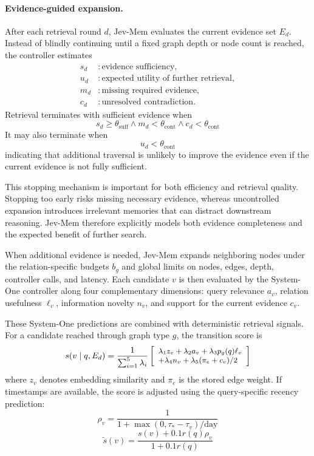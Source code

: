 \documentclass[11pt]{article}
\begin{document}
\paragraph{Evidence-guided expansion.}
After each retrieval round $d$, Jev-Mem evaluates the current evidence set $E_d$. Instead of blindly continuing until a fixed graph depth or node count is reached, the controller estimates
\begin{align}
s_d &: \text{evidence sufficiency}, \\
u_d &: \text{expected utility of further retrieval}, \\
m_d &: \text{missing required evidence}, \\
c_d &: \text{unresolved contradiction}.
\end{align}
Retrieval terminates with sufficient evidence when
\begin{equation}
s_d\geq\theta_{\mathrm{suff}}
\land
m_d<\theta_{\mathrm{cont}}
\land
c_d<\theta_{\mathrm{cont}}
\end{equation}
It may also terminate when
\begin{equation}
u_d<\theta_{\mathrm{cont}}
\end{equation}
indicating that additional traversal is unlikely to improve the evidence even if the current evidence is not fully sufficient.

This stopping mechanism is important for both efficiency and retrieval quality. Stopping too early risks missing necessary evidence, whereas uncontrolled expansion introduces irrelevant memories that can distract downstream reasoning. Jev-Mem therefore explicitly models both evidence completeness and the expected benefit of further search.

When additional evidence is needed, Jev-Mem expands neighboring nodes under the relation-specific budgets $b_g$ and global limits on nodes, edges, depth, controller calls, and latency. Each candidate $v$ is then evaluated by the System-One controller along four complementary dimensions: query relevance $a_v$, relation usefulness $\ell_v$, information novelty $n_v$, and support for the current evidence $c_v$.

These System-One predictions are combined with deterministic retrieval signals. For a candidate reached through graph type $g$, the transition score is
\begin{equation}
\small
s(v\mid q,E_d)=
\frac{1}{\sum_{i=1}^{5}\lambda_i}
\left[
\begin{array}{l}
\lambda_1 z_v+\lambda_2 a_v+\lambda_3 p_g(q)\ell_v \\
+\lambda_4 n_v+\lambda_5(\pi_e+c_v)/2
\end{array}
\right]
\end{equation}
where $z_v$ denotes embedding similarity and $\pi_e$ is the stored edge weight. If timestamps are available, the score is adjusted using the query-specific recency prediction:
\begin{equation}
\rho_v=
\frac{1}
{1+\max(0,\tau_*-\tau_v)/\mathrm{day}}
\end{equation}
\begin{equation}
\widetilde{s}(v)=
\frac{s(v)+0.1r(q)\rho_v}
{1+0.1r(q)}
\end{equation}
\end{document}
